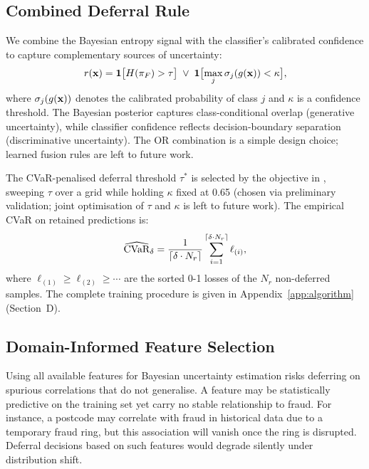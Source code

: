 \subsection{Combined Deferral Rule}
\label{sec:method_cvar}

We combine the Bayesian entropy signal with the classifier's calibrated confidence to capture complementary sources of uncertainty:
\begin{equation}
    r(\mathbf{x}) = \mathbf{1}\bigl[H(\pi_F) > \tau\bigr] \;\lor\; \mathbf{1}\bigl[\max_j \sigma_j(g(\mathbf{x})) < \kappa\bigr],
    \label{eq:combined_defer}
\end{equation}
where $\sigma_j(g(\mathbf{x}))$ denotes the calibrated probability of class $j$ and $\kappa$ is a confidence threshold. The Bayesian posterior captures class-conditional overlap (generative uncertainty), while classifier confidence reflects decision-boundary separation (discriminative uncertainty). The OR combination is a simple design choice; learned fusion rules are left to future work.

The CVaR-penalised deferral threshold $\tau^*$ is selected by the objective in , sweeping $\tau$ over a grid while holding $\kappa$ fixed at 0.65 (chosen via preliminary validation; joint optimisation of $\tau$ and $\kappa$ is left to future work). The empirical CVaR on retained predictions is:
\begin{equation}
    \widehat{\mathrm{CVaR}}_\delta = \frac{1}{\lceil \delta \cdot N_r \rceil} \sum_{i=1}^{\lceil \delta \cdot N_r \rceil} \ell_{(i)},
\end{equation}
where $\ell_{(1)} \geq \ell_{(2)} \geq \cdots$ are the sorted 0-1 losses of the $N_r$ non-deferred samples. The complete training procedure is given in Appendix~\ref{app:algorithm} (Section~D).

\subsection{Domain-Informed Feature Selection}
\label{sec:method_causal}

Using all available features for Bayesian uncertainty estimation risks deferring on spurious correlations that do not generalise. A feature may be statistically predictive on the training set yet carry no stable relationship to fraud. For instance, a postcode may correlate with fraud in historical data due to a temporary fraud ring, but this association will vanish once the ring is disrupted. Deferral decisions based on such features would degrade silently under distribution shift.

